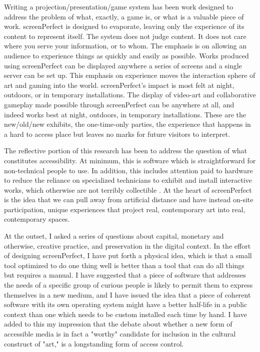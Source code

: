 Writing a projection/presentation/game system has been work designed to address the problem of what, exactly, a game is, or what is a valuable piece of work. screenPerfect is designed to evaporate, leaving only the experience of its content to represent itself. The system does not judge content. It does not care where you serve your information, or to whom. The emphasis is on allowing an audience to experience things as quickly and easily as possible. Works produced using screenPerfect can be displayed anywhere a series of screens and a single server can be set up. This emphasis on experience moves the interaction sphere of art and gaming into the world. screenPerfect's impact is most felt at night, outdoors, or in temporary installations. The display of video-art and collaborative gameplay made possible through screenPerfect can be anywhere at all, and indeed works best at night, outdoors, in temporary installations. These are the new/old/new exhibits, the one-time-only parties, the experience that happens in a hard to access place but leaves no marks for future visitors to interpret.

The reflective portion of this research has been to address the question of what constitutes accessibility. At minimum, this is software which is straightforward for non-technical people to use. In addition, this includes attention paid to hardware to reduce the reliance on specialized technicians to exhibit and install interactive works, which otherwise are not terribly collectible \cite{lisanotes}. At the heart of screenPerfect is the idea that we can pull away from artificial distance and have instead on-site participation, unique experiences that project real, contemporary art into real, contemporary spaces.

At the outset, I asked a series of questions about capital, monetary and otherwise, creative practice, and preservation in the digital context. In the effort of designing screenPerfect, I have put forth a physical idea, which is that a small tool optimized to do one thing well is better than a tool that can do all things but requires a manual. I have suggested that a piece of software that addresses the needs of a specific group of curious people is likely to permit them to express themselves in a new medium, and I have issued the idea that a piece of coherent software with its own operating system might have a better half-life in a public context than one which needs to be custom installed each time by hand. I have added to this my impression that the debate about whether a new form of accessible media is in fact a "worthy" candidate for inclusion in the cultural construct of "art," is a longstanding form of access control.

